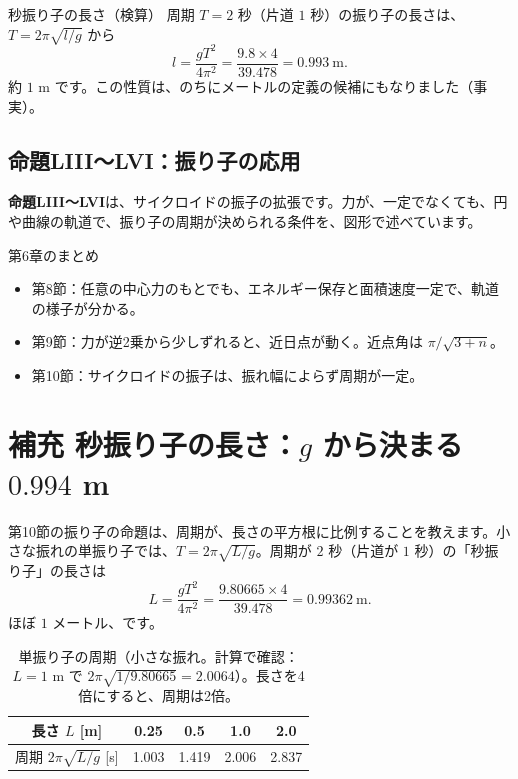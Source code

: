 \documentclass[a4paper,11pt,openany]{ltjsbook}
\begin{document}
\begin{examplebox}{秒振り子の長さ（検算）}
周期 $T=2$ 秒（片道 $1$ 秒）の振り子の長さは、$T=2\pi\sqrt{l/g}$ から
\[
l=\frac{gT^2}{4\pi^2}=\frac{9.8\times4}{39.478}=0.993\ \mathrm{m}.
\]
約 $1$ m です。この性質は、のちにメートルの定義の候補にもなりました（事実）。
\end{examplebox}

\subsection{命題LIII〜LVI：振り子の応用}

\textbf{命題LIII〜LVI}は、サイクロイドの振子の拡張です。力が、一定でなくても、円や曲線の軌道で、振り子の周期が決められる条件を、図形で述べています。

\begin{pointbox}{第6章のまとめ}
\begin{itemize}[leftmargin=1.5em]
\item 第8節：任意の中心力のもとでも、エネルギー保存と面積速度一定で、軌道の様子が分かる。
\item 第9節：力が逆2乗から少しずれると、近日点が動く。近点角は $\pi/\sqrt{3+n}$。
\item 第10節：サイクロイドの振子は、振れ幅によらず周期が一定。
\end{itemize}
\end{pointbox}

\section{補充 秒振り子の長さ：$g$ から決まる $0.994$ m}

第10節の振り子の命題は、周期が、長さの平方根に比例することを教えます。小さな振れの単振り子では、$T=2\pi\sqrt{L/g}$。周期が $2$ 秒（片道が $1$ 秒）の「秒振り子」の長さは
\[
L=\frac{gT^2}{4\pi^2}=\frac{9.80665\times4}{39.478}=0.99362\ \mathrm{m}.
\]
ほぼ $1$ メートル、です。

\begin{table}[htbp]
\centering
\begin{tabular}{c|cccc}
\toprule
長さ $L$ [m] & 0.25 & 0.5 & 1.0 & 2.0\\
\midrule
周期 $2\pi\sqrt{L/g}$ [s] & 1.003 & 1.419 & 2.006 & 2.837\\
\bottomrule
\end{tabular}
\caption{単振り子の周期（小さな振れ。計算で確認：$L=1$ m で $2\pi\sqrt{1/9.80665}=2.0064$）。長さを4倍にすると、周期は2倍。}
\end{table}
\end{document}

